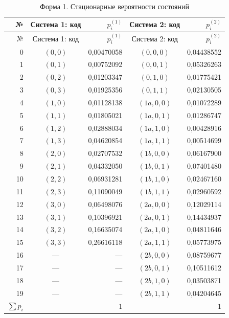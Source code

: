 \begin{longtable}{rcrcr}
\caption{Форма 1. Стационарные вероятности состояний}\label{tab:prob}\\
\hline № & Система 1: код & $p_i^{(1)}$ & Система 2: код & $p_i^{(2)}$ \\ \hline\endfirsthead
\hline № & Система 1: код & $p_i^{(1)}$ & Система 2: код & $p_i^{(2)}$ \\ \hline\endhead
0 & $(0,0)$ & 0{,}00470058 & $(0,0,0)$ & 0{,}04438552 \\
1 & $(0,1)$ & 0{,}00752092 & $(0,0,1)$ & 0{,}05326263 \\
2 & $(0,2)$ & 0{,}01203347 & $(0,1,0)$ & 0{,}01775421 \\
3 & $(0,3)$ & 0{,}01925356 & $(0,1,1)$ & 0{,}02130505 \\
4 & $(1,0)$ & 0{,}01128138 & $(1a,0,0)$ & 0{,}01072289 \\
5 & $(1,1)$ & 0{,}01805021 & $(1a,0,1)$ & 0{,}01286747 \\
6 & $(1,2)$ & 0{,}02888034 & $(1a,1,0)$ & 0{,}00428916 \\
7 & $(1,3)$ & 0{,}04620854 & $(1a,1,1)$ & 0{,}00514699 \\
8 & $(2,0)$ & 0{,}02707532 & $(1b,0,0)$ & 0{,}06167900 \\
9 & $(2,1)$ & 0{,}04332050 & $(1b,0,1)$ & 0{,}07401480 \\
10 & $(2,2)$ & 0{,}06931281 & $(1b,1,0)$ & 0{,}02467160 \\
11 & $(2,3)$ & 0{,}11090049 & $(1b,1,1)$ & 0{,}02960592 \\
12 & $(3,0)$ & 0{,}06498076 & $(2a,0,0)$ & 0{,}12029114 \\
13 & $(3,1)$ & 0{,}10396921 & $(2a,0,1)$ & 0{,}14434937 \\
14 & $(3,2)$ & 0{,}16635074 & $(2a,1,0)$ & 0{,}04811646 \\
15 & $(3,3)$ & 0{,}26616118 & $(2a,1,1)$ & 0{,}05773975 \\
16 & --- & --- & $(2b,0,0)$ & 0{,}08759677 \\
17 & --- & --- & $(2b,0,1)$ & 0{,}10511612 \\
18 & --- & --- & $(2b,1,0)$ & 0{,}03503871 \\
19 & --- & --- & $(2b,1,1)$ & 0{,}04204645 \\
\hline $\sum p_i$ & & $1$ & & $1$ \\ \hline
\end{longtable}